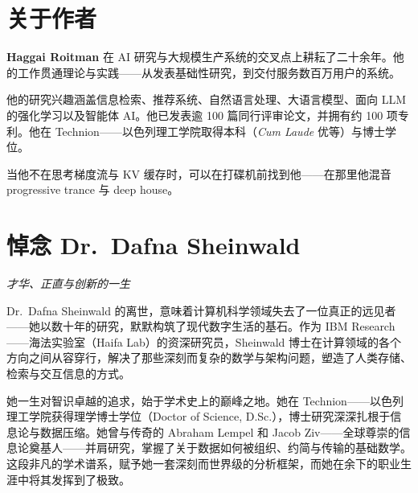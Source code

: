 \documentclass[11pt,a4paper,openany]{book}
\begin{document}
\chapter*{关于作者}
\label{about-the-author}

\textbf{Haggai Roitman} 在 AI 研究与大规模生产系统的交叉点上耕耘了二十余年。他的工作贯通理论与实践——从发表基础性研究，到交付服务数百万用户的系统。

他的研究兴趣涵盖信息检索、推荐系统、自然语言处理、大语言模型、面向 LLM 的强化学习以及智能体 AI。他已发表逾 100 篇同行评审论文，并拥有约 100 项专利。他在 Technion——以色列理工学院取得本科（\emph{Cum Laude} 优等）与博士学位。

当他不在思考梯度流与 KV 缓存时，可以在打碟机前找到他——在那里他混音 progressive trance 与 deep house。

\chapter*{悼念 Dr.\ Dafna Sheinwald}
\label{in-memoriam-dafna-sheinwald}

\begin{center}
{\large\itshape 才华、正直与创新的一生}
\end{center}

\bigskip

Dr.\ Dafna Sheinwald 的离世，意味着计算机科学领域失去了一位真正的远见者——她以数十年的研究，默默构筑了现代数字生活的基石。作为 IBM Research——海法实验室（Haifa Lab）的资深研究员，Sheinwald 博士在计算领域的各个方向之间从容穿行，解决了那些深刻而复杂的数学与架构问题，塑造了人类存储、检索与交互信息的方式。

她一生对智识卓越的追求，始于学术史上的巅峰之地。她在 Technion——以色列理工学院获得理学博士学位（Doctor of Science, D.Sc.），博士研究深深扎根于信息论与数据压缩。她曾与传奇的 Abraham Lempel 和 Jacob Ziv——全球尊崇的信息论奠基人——并肩研究，掌握了关于数据如何被组织、约简与传输的基础数学。这段非凡的学术谱系，赋予她一套深刻而世界级的分析框架，而她在余下的职业生涯中将其发挥到了极致。
\end{document}
